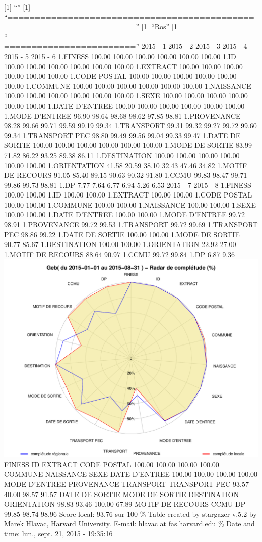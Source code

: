\documentclass[]{article}
\begin{document}
{[}1{]} ``'' {[}1{]}
``=====================================================================''
{[}1{]} ``Ros'' {[}1{]}
``=====================================================================''
2015 - 1 2015 - 2 2015 - 3 2015 - 4 2015 - 5 2015 - 6 1.FINESS 100.00
100.00 100.00 100.00 100.00 100.00 1.ID 100.00 100.00 100.00 100.00
100.00 100.00 1.EXTRACT 100.00 100.00 100.00 100.00 100.00 100.00 1.CODE
POSTAL 100.00 100.00 100.00 100.00 100.00 100.00 1.COMMUNE 100.00 100.00
100.00 100.00 100.00 100.00 1.NAISSANCE 100.00 100.00 100.00 100.00
100.00 100.00 1.SEXE 100.00 100.00 100.00 100.00 100.00 100.00 1.DATE
D'ENTREE 100.00 100.00 100.00 100.00 100.00 100.00 1.MODE D'ENTREE 96.90
98.64 98.68 98.62 97.85 98.81 1.PROVENANCE 98.28 99.66 99.71 99.59 99.19
99.34 1.TRANSPORT 99.31 99.32 99.27 99.72 99.60 99.34 1.TRANSPORT PEC
98.80 99.49 99.56 99.04 99.33 99.47 1.DATE DE SORTIE 100.00 100.00
100.00 100.00 100.00 100.00 1.MODE DE SORTIE 83.99 71.82 86.22 93.25
89.38 86.11 1.DESTINATION 100.00 100.00 100.00 100.00 100.00 100.00
1.ORIENTATION 41.58 20.59 38.10 32.43 47.46 34.82 1.MOTIF DE RECOURS
91.05 85.40 89.15 90.63 90.32 91.80 1.CCMU 99.83 98.47 99.71 99.86 99.73
98.81 1.DP 7.77 7.64 6.77 6.94 5.26 6.53 2015 - 7 2015 - 8 1.FINESS
100.00 100.00 1.ID 100.00 100.00 1.EXTRACT 100.00 100.00 1.CODE POSTAL
100.00 100.00 1.COMMUNE 100.00 100.00 1.NAISSANCE 100.00 100.00 1.SEXE
100.00 100.00 1.DATE D'ENTREE 100.00 100.00 1.MODE D'ENTREE 99.72 98.91
1.PROVENANCE 99.72 99.53 1.TRANSPORT 99.72 99.69 1.TRANSPORT PEC 98.86
99.22 1.DATE DE SORTIE 100.00 100.00 1.MODE DE SORTIE 90.77 85.67
1.DESTINATION 100.00 100.00 1.ORIENTATION 22.92 27.00 1.MOTIF DE RECOURS
88.64 90.97 1.CCMU 99.72 99.84 1.DP 6.87 9.36
\includegraphics{completude_files/figure-latex/finess-12.pdf} FINESS ID
EXTRACT CODE POSTAL 100.00 100.00 100.00 100.00 COMMUNE NAISSANCE SEXE
DATE D'ENTREE 100.00 100.00 100.00 100.00 MODE D'ENTREE PROVENANCE
TRANSPORT TRANSPORT PEC 93.57 40.00 98.57 91.57 DATE DE SORTIE MODE DE
SORTIE DESTINATION ORIENTATION 98.83 93.46 100.00 67.89 MOTIF DE RECOURS
CCMU DP 99.85 98.74 98.96 Score local: 93.76 sur 100 \% Table created by
stargazer v.5.2 by Marek Hlavac, Harvard University. E-mail: hlavac at
fas.harvard.edu \% Date and time: lun., sept. 21, 2015 - 19:35:16
\end{document}

